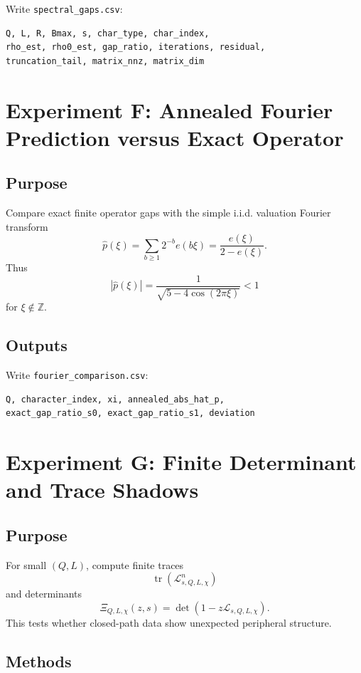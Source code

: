 \documentclass[11pt]{article}
\newcommand{\Z}{\mathbb Z}
\newcommand{\calL}{\mathcal L}
\begin{document}
Write \texttt{spectral\_gaps.csv}:
\begin{lstlisting}
Q, L, R, Bmax, s, char_type, char_index,
rho_est, rho0_est, gap_ratio, iterations, residual,
truncation_tail, matrix_nnz, matrix_dim
\end{lstlisting}

\section{Experiment F: Annealed Fourier Prediction versus Exact Operator}

\subsection{Purpose}

Compare exact finite operator gaps with the simple i.i.d. valuation Fourier transform
\[
        \widehat p(\xi)
        =
        \sum_{b\ge1}2^{-b}e(b\xi)
        =
        \frac{e(\xi)}{2-e(\xi)}.
\]
Thus
\[
        |\widehat p(\xi)|
        =
        \frac{1}{\sqrt{5-4\cos(2\pi\xi)}}
        <1
\]
for \(\xi\notin\Z\).

\subsection{Outputs}

Write \texttt{fourier\_comparison.csv}:
\begin{lstlisting}
Q, character_index, xi, annealed_abs_hat_p,
exact_gap_ratio_s0, exact_gap_ratio_s1, deviation
\end{lstlisting}

\section{Experiment G: Finite Determinant and Trace Shadows}

\subsection{Purpose}

For small \((Q,L)\), compute finite traces
\[
        \operatorname{tr}(\calL_{s,Q,L,\chi}^n)
\]
and determinants
\[
        \Xi_{Q,L,\chi}(z,s)=\det(1-z\calL_{s,Q,L,\chi}).
\]
This tests whether closed-path data show unexpected peripheral structure.

\subsection{Methods}
\end{document}

